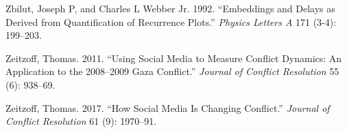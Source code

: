 \documentclass[english,man]{apa6}
\begin{document}
\leavevmode\hypertarget{ref-zbilut1992embeddings}{}%
Zbilut, Joseph P, and Charles L Webber Jr. 1992. ``Embeddings and Delays as Derived from Quantification of Recurrence Plots.'' \emph{Physics Letters A} 171 (3-4): 199--203.

\leavevmode\hypertarget{ref-zeitzoff2011using}{}%
Zeitzoff, Thomas. 2011. ``Using Social Media to Measure Conflict Dynamics: An Application to the 2008--2009 Gaza Conflict.'' \emph{Journal of Conflict Resolution} 55 (6): 938--69.

\leavevmode\hypertarget{ref-zeitzoff2017social}{}%
Zeitzoff, Thomas. 2017. ``How Social Media Is Changing Conflict.'' \emph{Journal of Conflict Resolution} 61 (9): 1970--91.

\endgroup
\end{document}
